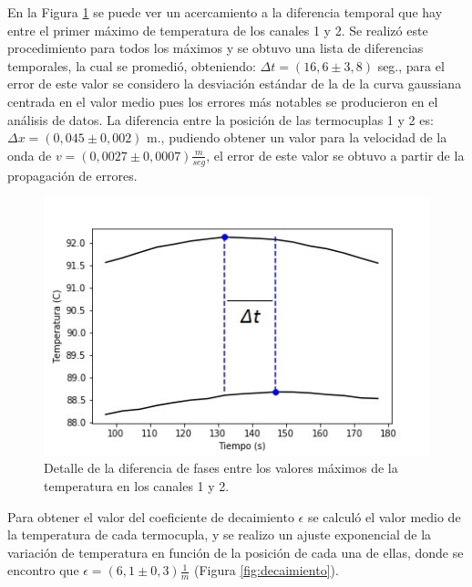 \documentclass[twoside,twocolumn,a4paper]{article}
\begin{document}
\par
En la Figura \ref{fig:deltat} se puede ver un acercamiento a la diferencia temporal que hay entre el primer m\'aximo de temperatura de los canales 1 y 2. Se realiz\'o este procedimiento para todos los m\'aximos y se obtuvo una lista de diferencias temporales, la cual se promedi\'o, obteniendo: $\Delta t = (16,6 \pm 3,8)$ seg., para el error de este valor se considero la desviaci\'on est\'andar de la de la curva gaussiana centrada en el valor medio pues los errores m\'as notables se producieron en el an\'alisis de datos. La diferencia entre la posici\'on de las termocuplas 1 y 2 es: $\Delta x = (0,045 \pm 0,002)$ m., pudiendo obtener un valor para la velocidad de la onda de $v = (0,0027 \pm 0,0007) \frac{m}{seg}$, el error de este valor se obtuvo a partir de la propagaci\'on de errores.

\begin{figure}[H]
\includegraphics[width=\linewidth]{deltat.jpg}
\caption{Detalle de la diferencia de fases entre los valores m\'aximos de la temperatura en los canales 1 y 2.}
\label{fig:deltat}
\end{figure}


Para obtener el valor del coeficiente de decaimiento $\epsilon$ se calcul\'o el valor medio de la temperatura de cada termocupla, y se realizo un ajuste exponencial de la variaci\'on de temperatura en funci\'on de la posici\'on de cada una de ellas, donde se encontro que $\epsilon = (6,1 \pm 0,3) \frac{1}{m} $ (Figura \ref{fig:decaimiento}).
\end{document}
